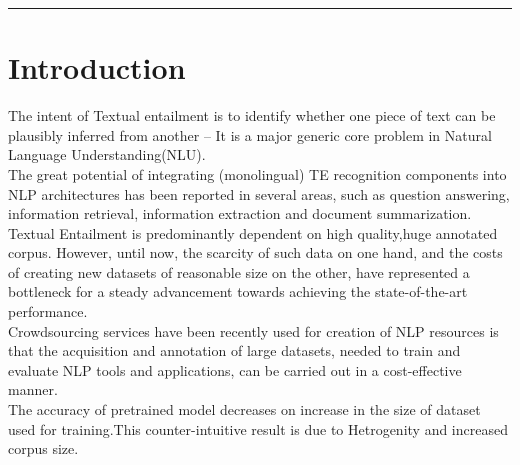 \documentclass[12pt,a4paper]{article}
\begin{document}
\reviewtitle
\hrule

\section{Introduction}
The intent of Textual entailment is to identify whether one piece of text can be plausibly inferred from another – It is a major generic core problem in Natural Language Understanding(NLU).\\
The great potential of integrating (monolingual) TE recognition components into NLP architectures has been reported in several areas, such as question answering, information retrieval, information extraction and document summarization.\\
Textual Entailment is predominantly dependent on high quality,huge annotated corpus. However, until now, the scarcity of such data on one hand, and the costs of creating new datasets of reasonable size on the other, have represented a bottleneck for a steady advancement
towards achieving the state-of-the-art performance.\\
Crowdsourcing services have been recently used for creation of NLP resources is that the acquisition and annotation of large datasets, needed to train and evaluate NLP tools and applications, can be carried out in a cost-effective manner.\\
The accuracy of pretrained model decreases on increase in the size of dataset used for training.This counter-intuitive result is due to Hetrogenity and increased corpus size. 
\end{document}
